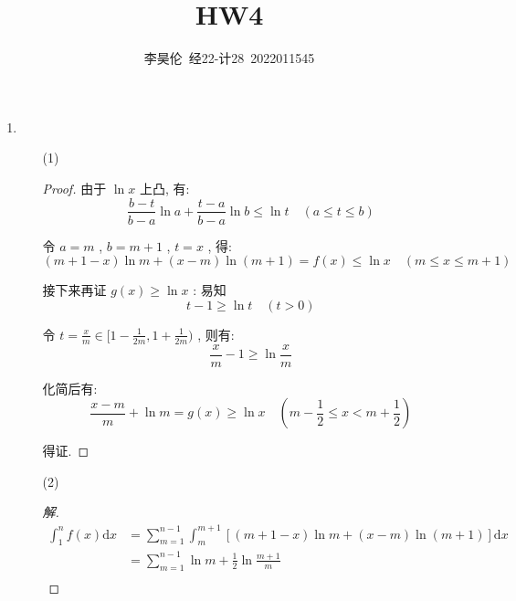 \documentclass{article}
\title{HW4}
\author{李昊伦\ 经22-计28\ 2022011545}
\begin{document}
\maketitle
\begin{enumerate}
    \item \begin{enumerate}
        \item[(1)] \begin{proof}
            由于 $\ln x$ 上凸, 有: \begin{equation}
                \frac{b-t}{b-a}\ln a+\frac{t-a}{b-a}\ln b\leq\ln t \quad (a\leq t\leq b)
                \nonumber
            \end{equation} \par
            令 $a=m$ , $b=m+1$ , $t=x$ , 得: \begin{equation}
                (m+1-x)\ln m+(x-m)\ln(m+1)=f(x)\leq\ln x \quad (m\leq x\leq m+1)
                \nonumber
            \end{equation} \par
            接下来再证 $g(x)\geq\ln x$ : 易知 \begin{equation}
                t-1\geq\ln t \quad (t>0)
                \nonumber
            \end{equation} \par
            令 $t=\frac{x}{m}\in[1-\frac{1}{2m},1+\frac{1}{2m})$ , 则有: \begin{equation}
                \frac{x}{m}-1\geq\ln\frac{x}{m}
                \nonumber
            \end{equation} \par
            化简后有: \begin{equation}
                \frac{x-m}{m}+\ln m=g(x)\geq\ln x \quad (m-\frac{1}{2}\leq x<m+\frac{1}{2})
                \nonumber
            \end{equation} \par
            得证.
        \end{proof}
        \item[(2)] \begin{proof}[解]
            \begin{equation}
                \begin{aligned}
                    \int_{1}^{n}f(x)\mathrm{d}x
                    &=\sum_{m=1}^{n-1}\int_{m}^{m+1}\left[(m+1-x)\ln m+(x-m)\ln(m+1)\right]\mathrm{d}x \\
                    &=\sum_{m=1}^{n-1}\ln m +\frac{1}{2}\ln\frac{m+1}{m} \\

\end{aligned}
\end{equation}
\end{proof}
\end{enumerate}
\end{enumerate}
\end{document}
